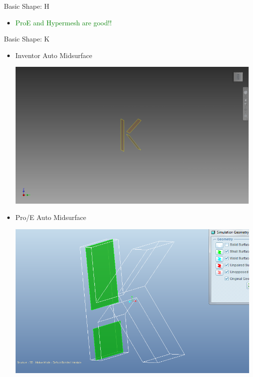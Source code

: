 \begin{frame}{Basic Shape: H}
\begin{itemize}[noitemsep,label=\textbullet,topsep=2pt,parsep=2pt,partopsep=2pt]
\item \textcolor{green}{ProE and Hypermesh are good!!}
\end{itemize}
\end{frame}

\begin{frame}{Basic Shape: K}
\begin{itemize}[noitemsep,label=\textbullet,topsep=2pt,parsep=2pt,partopsep=2pt]

\item Inventor Auto Midsurface

\includegraphics[scale=0.11]{../Common/images/Inventor_K_Mids.png}

\item Pro/E Auto Midsurface

\includegraphics[scale=0.15]{../Common/images/ProeKautoPairs.png}


\end{itemize}
\end{frame}
